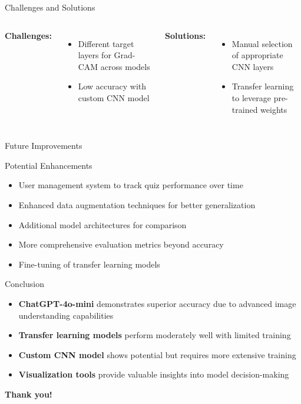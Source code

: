\documentclass{beamer}
\begin{document}
\begin{frame}{Challenges and Solutions}
    \begin{columns}[T]
        \textbf{\textcolor{accentcolor}{Challenges:}}
        \begin{itemize}
            \item Different target layers for Grad-CAM across models
            \item Low accuracy with custom CNN model
        \end{itemize}
        
        \textbf{\textcolor{highlightcolor}{Solutions:}}
        \begin{itemize}
            \item Manual selection of appropriate CNN layers
            \item Transfer learning to leverage pre-trained weights
        \end{itemize}
    \end{columns}
\end{frame}

\begin{frame}{Future Improvements}
    \begin{block}{Potential Enhancements}
        \begin{itemize}
            \item User management system to track quiz performance over time
            \item Enhanced data augmentation techniques for better generalization
            \item Additional model architectures for comparison
            \item More comprehensive evaluation metrics beyond accuracy
            \item Fine-tuning of transfer learning models
        \end{itemize}
    \end{block}
\end{frame}

\begin{frame}{Conclusion}
    \begin{itemize}
        \item \textbf{ChatGPT-4o-mini} demonstrates superior accuracy due to advanced image understanding capabilities
        \item \textbf{Transfer learning models} perform moderately well with limited training
        \item \textbf{Custom CNN model} shows potential but requires more extensive training
        \item \textbf{Visualization tools} provide valuable insights into model decision-making
    \end{itemize}
    
    \vspace{0.5cm}
    \begin{center}
        \textbf{\textcolor{maincolor}{Thank you!}}
    \end{center}
\end{frame}
\end{document}
